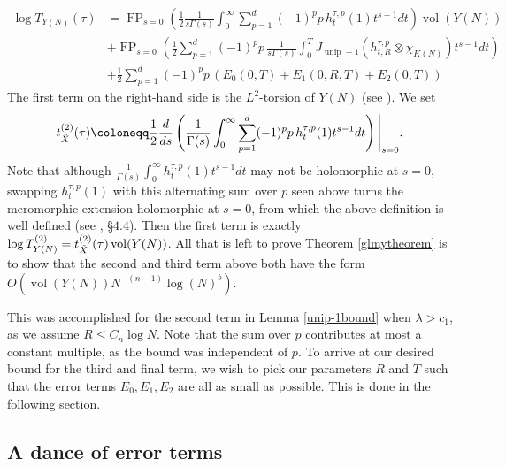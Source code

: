 \documentclass[11pt,reqno]{amsart}
\numberwithin{equation}{section}
\theoremstyle{definition}
\theoremstyle{remark}
\newcommand{\vol}{\operatorname{vol}}
\newcommand{\unip}{\operatorname{unip}}
\newcommand{\FP}{\operatorname{FP}}
\begin{document}
\begin{align}\label{analbound}
    \log T_{Y(N)}(\tau) &= \FP_{s=0}\left(\frac12\frac{1}{s\Gamma(s)}\int_0^\infty\sum_{p=1}^d (-1)^p p \, h^{\tau,p}_t(1)t^{s-1}dt\right) \vol(Y(N)) \\\label{FPunip-1}
    &+ \FP_{s=0}\left(\frac12\sum_{p=1}^d (-1)^p p\,\frac{1}{s\Gamma(s)} \int_0^T J_{\unip-1}(h^{\tau,p}_{t,R}\otimes\chi_{K(N)})t^{s-1}dt\right) \\
    &+ \frac12\sum_{p=1}^d (-1)^p p\, \left(E_0(0,T) + E_1(0,R,T)+E_2(0,T)\right)
\end{align}
The first term on the right-hand side is the $L^2$-torsion of $Y(N)$ (see \cite{Lott}). We set
\begin{align*}
    t^{(2)}_{\Tilde{X}}(\tau)\coloneqq  \frac12\frac{d}{ds}\left( \frac{1}{\Gamma(s)}\int_0^\infty\sum_{p=1}^d (-1)^p p \, h^{\tau,p}_t(1)t^{s-1}dt\right)\Bigg\vert_{s=0}.
\end{align*}
Note that although $\frac{1}{\Gamma(s)}\int_0^\infty h^{\tau,p}_t(1)t^{s-1}dt$ may not be holomorphic at $s=0$, swapping $h^{\tau,p}_t(1)$ with this alternating sum over $p$ seen above turns the meromorphic extension holomorphic at $s=0$, from which the above definition is well defined (see \cite{BV}, §$4.4$). Then the first term is exactly $\log T^{(2)}_{Y(N)} = t^{(2)}_{\Tilde{X}}(\tau)\vol(Y(N))$. All that is left to prove Theorem \ref{glmytheorem} is to show that the second and third term above both have the form $O(\vol(Y(N))N^{-(n-1)}\log(N)^b)$.

This was accomplished for the second term in Lemma \ref{unip-1bound} when $\lambda>c_1$, as we assume $R\leq C_n\log N$. Note that the sum over $p$ contributes at most a constant multiple, as the bound was independent of $p$. To arrive at our desired bound for the third and final term, we wish to pick our parameters $R$ and $T$ such that the error terms $E_0,E_1,E_2$ are all as small as possible. This is done in the following section.

\subsection*{A dance of error terms}\label{dance}
\end{document}
